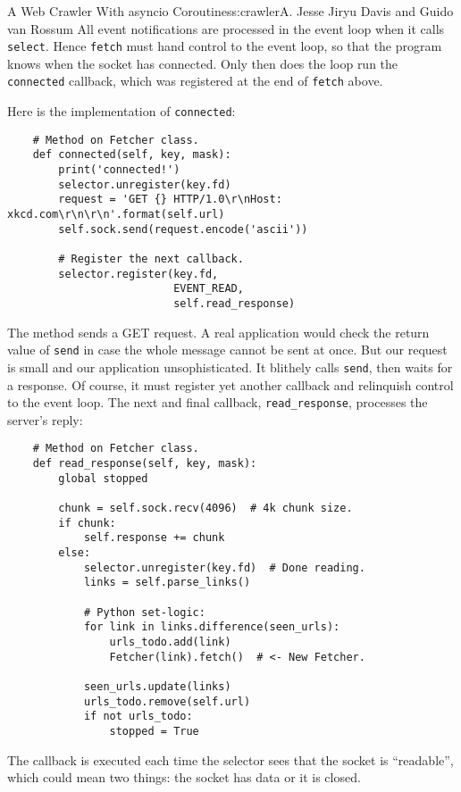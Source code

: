 \begin{aosachapter}{A Web Crawler With asyncio Coroutines}{s:crawler}{A. Jesse Jiryu Davis and Guido van Rossum}
All event notifications are processed in the event loop when it calls
\texttt{select}. Hence \texttt{fetch} must hand control to the event
loop, so that the program knows when the socket has connected. Only then
does the loop run the \texttt{connected} callback, which was registered
at the end of \texttt{fetch} above.

Here is the implementation of \texttt{connected}:

\begin{verbatim}
    # Method on Fetcher class.
    def connected(self, key, mask):
        print('connected!')
        selector.unregister(key.fd)
        request = 'GET {} HTTP/1.0\r\nHost: xkcd.com\r\n\r\n'.format(self.url)
        self.sock.send(request.encode('ascii'))
        
        # Register the next callback.
        selector.register(key.fd,
                          EVENT_READ,
                          self.read_response)
\end{verbatim}

The method sends a GET request. A real application would check the
return value of \texttt{send} in case the whole message cannot be sent
at once. But our request is small and our application unsophisticated.
It blithely calls \texttt{send}, then waits for a response. Of course,
it must register yet another callback and relinquish control to the
event loop. The next and final callback, \texttt{read\_response},
processes the server's reply:

\begin{verbatim}
    # Method on Fetcher class.
    def read_response(self, key, mask):
        global stopped

        chunk = self.sock.recv(4096)  # 4k chunk size.
        if chunk:
            self.response += chunk
        else:
            selector.unregister(key.fd)  # Done reading.
            links = self.parse_links()
            
            # Python set-logic:
            for link in links.difference(seen_urls):
                urls_todo.add(link)
                Fetcher(link).fetch()  # <- New Fetcher.

            seen_urls.update(links)
            urls_todo.remove(self.url)
            if not urls_todo:
                stopped = True
\end{verbatim}

The callback is executed each time the selector sees that the socket is
``readable'', which could mean two things: the socket has data or it is
closed.


\end{aosachapter}
